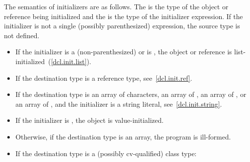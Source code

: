 \pnum
The semantics of initializers are as follows.
The
%
is the type of the object or reference being initialized and the
is the type of the initializer expression.
If the initializer is not a single (possibly parenthesized) expression, the
source type is not defined.
\begin{itemize}
\item
If the initializer is a (non-parenthesized) 
or is \tcode{=} , the object or reference
is list-initialized~(\ref{dcl.init.list}).
\item
If the destination type is a reference type, see~\ref{dcl.init.ref}.
\item
If the destination type is an array of characters,
an array of ,
an array of ,
or an array of
,
and the initializer is a string literal, see~\ref{dcl.init.string}.
\item If the initializer is \tcode{()}, the object is value-initialized.
\item
Otherwise, if the destination type is an array, the program is ill-formed.
\item
If the destination type is a (possibly cv-qualified) class type:


\end{itemize}
